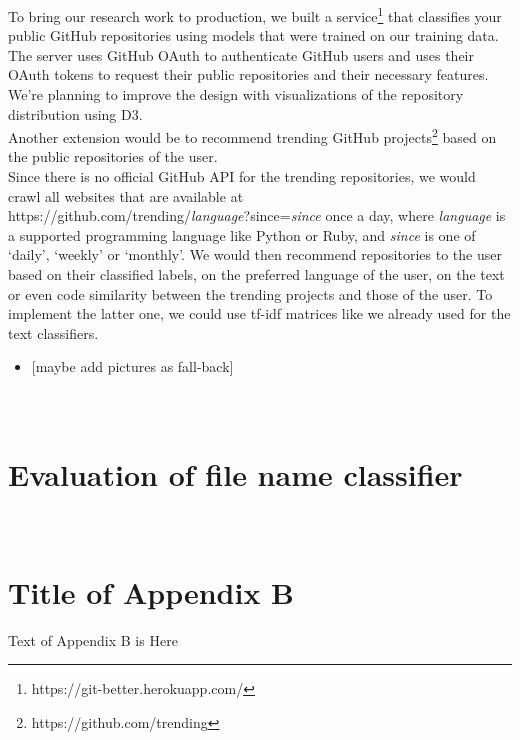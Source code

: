 \documentclass[%
a4paper,
DIV12,
2.5headlines,
bigheadings,
titlepage,
openbib,
]{scrartcl}
\begin{document}
To bring our research work to production, we built a service\footnote{https://git-better.herokuapp.com/} that classifies your public GitHub repositories using models that were trained on our training data.
The server uses GitHub OAuth to authenticate GitHub users and uses their OAuth tokens to request their public repositories and their necessary features.
We're planning to improve the design with visualizations of the repository distribution using D3.\\
Another extension would be to recommend trending GitHub projects\footnote{https://github.com/trending} based on the public repositories of the user.\\
Since there is no official GitHub API for the trending repositories, we would crawl all websites that are available at \\
https://github.com/trending/\textit{language}?since=\textit{since} once a day, where \textit{language} is a supported programming language like Python or Ruby, and \textit{since} is one of `daily', `weekly' or `monthly'.
We would then recommend repositories to the user based on their classified labels, on the preferred language of the user, on the text or even code similarity between the trending projects and those of the user.
To implement the latter one, we could use tf-idf matrices like we already used for the text classifiers.

\begin{itemize}
\tightlist
\item
  {[}maybe add pictures as fall-back{]}
\end{itemize}

\newpage
\appendix
\section{\\Evaluation of file name classifier} \label{App:AppendixA}





\newpage
\section{\\Title of Appendix B} \label{App:AppendixB}

Text of Appendix B is Here
\end{document}
